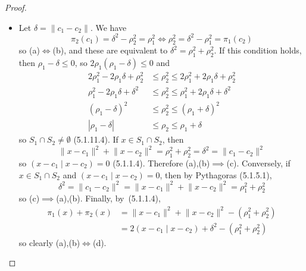 \documentclass[letterpaper,12pt]{article}
\newcommand{\sect}{\cap}
\newcommand{\abs}[1]{|{#1}|}
\newcommand{\norm}[1]{\lVert{#1}\rVert}
\newcommand{\innerprod}[2]{({#1}\;|\;{#2})}
\theoremstyle{definition}
\theoremstyle{remark}
\begin{document}
\begin{proof}
\begin{itemize}[itemsep=0pt]
\item Let \(\delta=\norm{c_1-c_2}\). We have
\[\pi_2(c_1)=\delta^2-\rho_2^2=\rho_1^2\iff\rho_2^2=\delta^2-\rho_1^2=\pi_1(c_2)\]
so (a)\(\iff\)(b), and these are equivalent to \(\delta^2=\rho_1^2+\rho_2^2\). If this condition holds, then \(\rho_1-\delta\le 0\), so \(2\rho_1(\rho_1-\delta)\le 0\) and
\begin{align*}
2\rho_1^2-2\rho_1\delta+\rho_2^2&\le\rho_2^2\le2\rho_1^2+2\rho_1\delta+\rho_2^2\\
\rho_1^2-2\rho_1\delta+\delta^2&\le\rho_2^2\le\rho_1^2+2\rho_1\delta+\delta^2\\
(\rho_1-\delta)^2&\le\rho_2^2\le(\rho_1+\delta)^2\\
\abs{\rho_1-\delta}&\le\rho_2\le\rho_1+\delta
\end{align*}
so \(S_1\sect S_2\ne\emptyset\) (5.1.11.4). If \(x\in S_1\sect S_2\), then
\[\norm{x-c_1}^2+\norm{x-c_2}^2=\rho_1^2+\rho_2^2=\delta^2=\norm{c_1-c_2}^2\]
so \(\innerprod{x-c_1}{x-c_2}=0\) (5.1.1.4). Therefore (a),(b)\(\implies\)(c). Conversely, if \(x\in S_1\sect S_2\) and \(\innerprod{x-c_1}{x-c_2}=0\), then by Pythagoras (5.1.5.1),
\[\delta^2=\norm{c_1-c_2}^2=\norm{x-c_1}^2+\norm{x-c_2}^2=\rho_1^2+\rho_2^2\]
so (c)\(\implies\)(a),(b). Finally, by~(5.1.1.4),
\begin{align*}
\pi_1(x)+\pi_2(x)&=\norm{x-c_1}^2+\norm{x-c_2}^2-(\rho_1^2+\rho_2^2)\\
	&=2\innerprod{x-c_1}{x-c_2}+\delta^2-(\rho_1^2+\rho_2^2)
\end{align*}
so clearly (a),(b)\(\iff\)(d).\qedhere
\end{itemize}
\end{proof}
\end{document}
